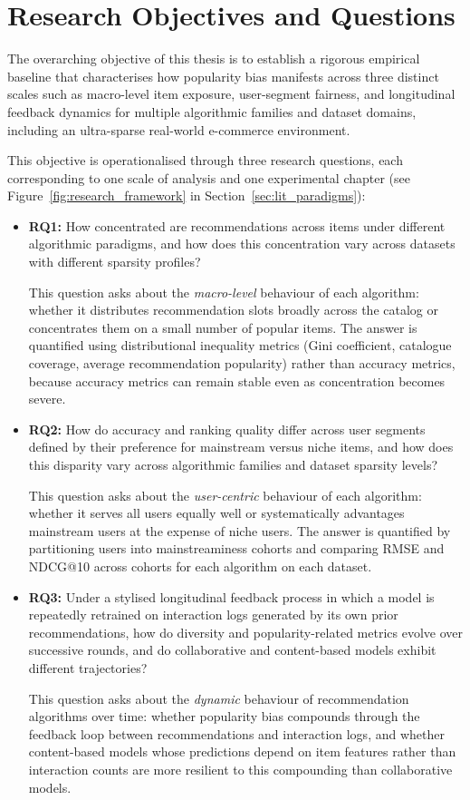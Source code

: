 \documentclass[11pt,a4paper]{report}
\begin{document}
\section{Research Objectives and Questions}

The overarching objective of this thesis is to establish a rigorous empirical baseline that characterises how popularity bias manifests across three distinct scales such as macro-level item exposure, user-segment fairness, and longitudinal feedback dynamics for multiple algorithmic families and dataset domains, including an ultra-sparse real-world e-commerce environment.

This objective is operationalised through three research questions, each corresponding to one scale of analysis and one experimental chapter (see Figure~\ref{fig:research_framework} in Section~\ref{sec:lit_paradigms}):

\begin{itemize}
    \item \textbf{RQ1:} How concentrated are recommendations across items under different algorithmic paradigms, and how does this concentration vary across datasets with different sparsity profiles?

    This question asks about the \emph{macro-level} behaviour of each algorithm: whether it distributes recommendation slots broadly across the catalog or concentrates them on a small number of popular items. The answer is quantified using distributional inequality metrics (Gini coefficient, catalogue coverage, average recommendation popularity) rather than accuracy metrics, because accuracy metrics can remain stable even as concentration becomes severe.

    \item \textbf{RQ2:} How do accuracy and ranking quality differ across user segments defined by their preference for mainstream versus niche items, and how does this disparity vary across algorithmic families and dataset sparsity levels?

    This question asks about the \emph{user-centric} behaviour of each algorithm: whether it serves all users equally well or systematically advantages mainstream users at the expense of niche users. The answer is quantified by partitioning users into mainstreaminess cohorts and comparing RMSE and NDCG@10 across cohorts for each algorithm on each dataset.

    \item \textbf{RQ3:} Under a stylised longitudinal feedback process in which a model is repeatedly retrained on interaction logs generated by its own prior recommendations, how do diversity and popularity-related metrics evolve over successive rounds, and do collaborative and content-based models exhibit different trajectories?

    This question asks about the \emph{dynamic} behaviour of recommendation algorithms over time: whether popularity bias compounds through the feedback loop between recommendations and interaction logs, and whether content-based models whose predictions depend on item features rather than interaction counts are more resilient to this compounding than collaborative models.
\end{itemize}
\end{document}
